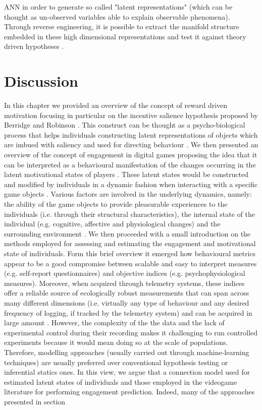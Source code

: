 ANN in order to generate so called "latent representations" (which can be thought as un-observed variables able to explain observable phenomena). Through reverse engineering, it is possible to extract the manifold structure embedded in these high dimensional representations and test it against theory driven hypotheses \cite{barak2017recurrent,kietzmann2018deep}. 

\section{Discussion}
\label{discussion_litreview}
In this chapter we provided an overview of the concept of reward driven motivation focusing in particular on the incentive salience hypothesis proposed by Berridge and Robinson \cite{berridge1998role}. This construct can be thought as a psycho-biological process that helps individuals constructing latent representations of objects which are imbued with saliency and used for directing behaviour \cite{berridge2004motivation}. We then presented an overview of the concept of engagement in digital games proposing the idea that it can be interpreted as a behavioural manifestation of the changes occurring in the latent motivational states of players \cite{o2008user,berridge2004motivation}. These latent states would be constructed and modified by individuals in a dynamic fashion when interacting with a specific game objects \cite{o2008user,berridge2004motivation}. Various factors are involved in the underlying dynamics, namely: the ability of the game objects to provide pleasurable experiences to the individuals (i.e. through their structural characteristics), the internal state of the individual (e.g. cognitive, affective and physiological changes) and the surrounding environment \cite{lucas2004sex,o2008user,jennett2008measuring,boyle2012engagement,connolly2012systematic,berridge2004motivation,csikszentmihalyi2014toward}. We then proceeded with a small introduction on the methods employed for assessing and estimating the engagement and motivational state of individuals. Form this brief overview it emerged how behavioural metrics appear to be a good compromise between scalable and easy to interpret measures (e.g. self-report questionnaires) and objective indices (e.g. psychophysiological measures). Moreover, when acquired through telemetry systems, these indices offer a reliable source of ecologically robust measurements that can span across many different dimensions (i.e. virtually any type of behaviour and any desired frequency of logging, if tracked by the telemetry system) and can be acquired in large amount \cite{el2016game}. However, the complexity of the the data and the lack of experimental control during their recording makes it challenging to run controlled experiments because it would mean doing so at the scale of populations. Therefore, modelling approaches (usually carried out through machine-learning techniques) are usually preferred over conventional hypothesis testing or inferential statics ones. In this view, we argue that a connection model used for estimated latent states of individuals and those employed in the videogame literature for performing engagement prediction. Indeed, many of the approaches presented in section 